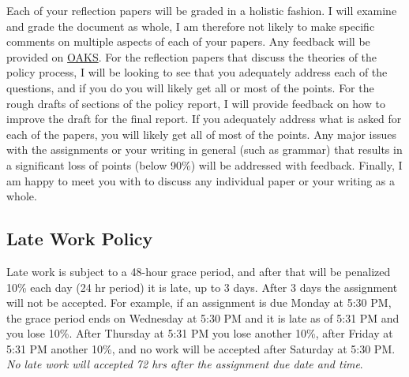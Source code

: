 Each of your reflection papers will be graded in a holistic fashion. I
will examine and grade the document as whole, I am therefore not likely
to make specific comments on multiple aspects of each of your papers.
Any feedback will be provided on \href{https://lms.cofc.edu}{OAKS}. For
the reflection papers that discuss the theories of the policy process, I
will be looking to see that you adequately address each of the
questions, and if you do you will likely get all or most of the points.
For the rough drafts of sections of the policy report, I will provide
feedback on how to improve the draft for the final report. If you
adequately address what is asked for each of the papers, you will likely
get all of most of the points. Any major issues with the assignments or
your writing in general (such as grammar) that results in a significant
loss of points (below 90\%) will be addressed with feedback. Finally, I
am happy to meet you with to discuss any individual paper or your
writing as a whole.

\hypertarget{late-work-policy}{%
\subsection{Late Work Policy}\label{late-work-policy}}

Late work is subject to a 48-hour grace period, and after that will be
penalized 10\% each day (24 hr period) it is late, up to 3 days. After 3
days the assignment will not be accepted. For example, if an assignment
is due Monday at 5:30 PM, the grace period ends on Wednesday at 5:30 PM
and it is late as of 5:31 PM and you lose 10\%. After Thursday at 5:31
PM you lose another 10\%, after Friday at 5:31 PM another 10\%, and no
work will be accepted after Saturday at 5:30 PM. \emph{No late work will
accepted 72 hrs after the assignment due date and time}.

